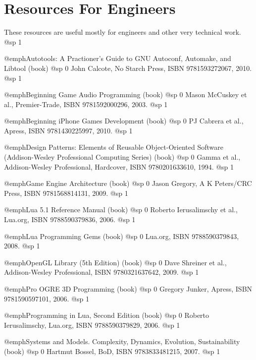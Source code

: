 \section{Resources For Engineers}
These resources are useful mostly for engineers and other very technical work.
@sp 1
\itemize

\item
@emph{Autotools: A Practioner's Guide to GNU Autoconf, Automake, and Libtool} (book)
@sp 0
John Calcote, No Starch Press, ISBN 9781593272067, 2010.
@sp 1

\item
@emph{Beginning Game Audio Programming} (book)
@sp 0
Mason McCuskey et al., Premier-Trade, ISBN 9781592000296, 2003.
@sp 1

\item
@emph{Beginning iPhone Games Development} (book)
@sp 0
PJ Cabrera et al., Apress, ISBN 9781430225997, 2010.
@sp 1

\item
@emph{Design Patterns: Elements of Reusable Object-Oriented Software (Addison-Wesley Professional Computing Series)} (book)
@sp 0
Gamma et al., Addison-Wesley Professional, Hardcover, ISBN 9780201633610, 1994.
@sp 1

\item
@emph{Game Engine Architecture} (book)
@sp 0
Jason Gregory, A K Peters/CRC Press, ISBN 9781568814131, 2009.
@sp 1

\item
@emph{Lua 5.1 Reference Manual} (book)
@sp 0
Roberto Ierusalimschy et al., Lua.org, ISBN 9788590379836, 2006.
@sp 1

\item
@emph{Lua Programming Gems} (book)
@sp 0
Lua.org, ISBN 9788590379843, 2008.
@sp 1

\item
@emph{OpenGL Library (5th Edition)} (book)
@sp 0
Dave Shreiner et al., Addison-Wesley Professional, ISBN 9780321637642, 2009.
@sp 1

\item
@emph{Pro OGRE 3D Programming} (book)
@sp 0
Gregory Junker, Apress, ISBN 9781590597101, 2006.
@sp 1

\item
@emph{Programming in Lua, Second Edition} (book)
@sp 0
Roberto Ierusalimschy, Lua.org, ISBN 9788590379829, 2006.
@sp 1

\item
@emph{Systems and Models. Complexity, Dynamics, Evolution, Sustainability} (book)
@sp 0
Hartmut Bossel, BoD, ISBN 9783833481215, 2007.
@sp 1

